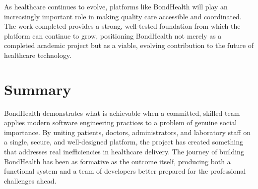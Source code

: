 \noindent As healthcare continues to evolve, platforms like BondHealth will play an increasingly important role in making quality care accessible and coordinated. The work completed provides a strong, well-tested foundation from which the platform can continue to grow, positioning BondHealth not merely as a completed academic project but as a viable, evolving contribution to the future of healthcare technology.

\section{Summary}

\noindent BondHealth demonstrates what is achievable when a committed, skilled team applies modern software engineering practices to a problem of genuine social importance. By uniting patients, doctors, administrators, and laboratory staff on a single, secure, and well-designed platform, the project has created something that addresses real inefficiencies in healthcare delivery. The journey of building BondHealth has been as formative as the outcome itself, producing both a functional system and a team of developers better prepared for the professional challenges ahead.
